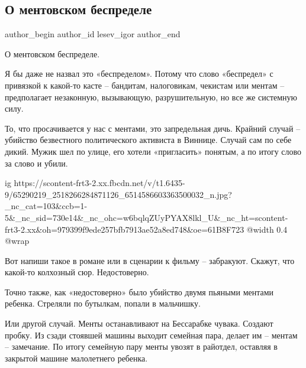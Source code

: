  
 
 
 
 
 
\subsection{О ментовском беспределе}
\label{sec:24_06_2019.fb.lesev_igor.1.bespredel_menty}
 
\ifcmt
 author_begin
   author_id lesev_igor
 author_end
\fi

О ментовском беспределе.

Я бы даже не назвал это «беспределом». Потому что слово «беспредел» с привязкой
к какой-то касте – бандитам, налоговикам, чекистам или ментам – предполагает
незаконную, вызывающую, разрушительную, но все же системную силу.

То, что просачивается у нас с ментами, это запредельная дичь. Крайний случай –
убийство безвестного политического активиста в Виннице. Случай сам по себе
дикий. Мужик шел по улице, его хотели «пригласить» понятым, а по итогу слово за
слово и убили.

\ifcmt
  ig https://scontent-frt3-2.xx.fbcdn.net/v/t1.6435-9/65290219_2518266284871126_6514586603363500032_n.jpg?_nc_cat=103&ccb=1-5&_nc_sid=730e14&_nc_ohc=w6bqlqZUyPYAX8lkl_U&_nc_ht=scontent-frt3-2.xx&oh=979399f9ede257bfb7913ae52a8ed748&oe=61B8F723
  @width 0.4
  @wrap 
\fi

Вот напиши такое в романе или в сценарии к фильму – забракуют. Скажут, что
какой-то колхозный сюр. Недостоверно.

Точно также, как «недостоверно» было убийство двумя пьяными ментами ребенка.
Стреляли по бутылкам, попали в мальчишку.

Или другой случай. Менты останавливают на Бессарабке чувака. Создают пробку. Из
сзади стоявшей машины выходит семейная пара, делает им – ментам – замечание. По
итогу семейную пару менты увозят в райотдел, оставляя в закрытой машине
малолетнего ребенка.


